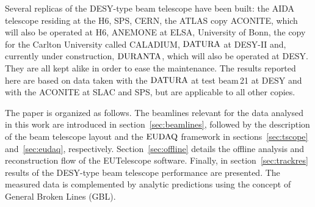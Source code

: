Several replicas of the DESY-type beam telescope have been built:
 the AIDA telescope residing at the H6, SPS, CERN, the ATLAS copy ACONITE, which will also be operated at H6, ANEMONE at ELSA, University of Bonn, the copy for the Carlton University called CALADIUM, 
 $\textrm{DATURA}$ at DESY-II and, currently under construction, $\textrm{DURANTA}$, which will also be operated at DESY. 
They are all kept alike in order to ease the maintenance. 
The results reported here are based on data taken with the $\textrm{DATURA}$ at test beam\,21 at DESY and with the ACONITE at SLAC and SPS, but are applicable to all other copies. 

The paper is organized as follows. 
The beamlines relevant for the data analysed in this work are introduced in section~\ref{sec:beamlines}, followed by the description of the beam telescope layout
 and the $\textrm{EUDAQ}$ framework in sections~\ref{sec:tscope} and~\ref{sec:eudaq}, respectively.
Section~\ref{sec:offline} details the offline analysis and reconstruction flow of the EUTelescope software. 
Finally, in section~\ref{sec:trackres} results of the DESY-type beam telescope performance are presented. %
The measured data is complemented by analytic predictions using the concept of General Broken Lines (GBL).
